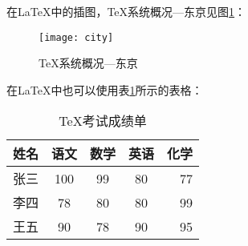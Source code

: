 \documentclass{ctexart}
\begin{document}
	
%	

%
	
	在\LaTeX{}中的插图，\TeX 系统概况---东京见图\ref{fig-city}：
	\begin{figure}[htbp]
		\centering %
		\texttt{[image: city]}
		\caption{\TeX 系统概况---东京} \label{fig-city} %
	\end{figure}
	
	在\LaTeX{}中也可以使用表\ref{tab-score}所示的表格：
	\begin{table}[htbp]
		\centering
		\caption{\TeX 考试成绩单} \label{tab-score}
		\begin{tabular}{|l|c|c|c|r|} 
			\hline
			姓名 & 语文 & 数学 & 英语 & 化学 \\
			\hline \hline
			张三 & 100 & 99 & 80 & 77 \\
			\hline
			李四 & 78 & 80 & 80 & 99 \\
			\hline
			王五 & 90 & 78 & 90 & 95 \\
			\hline
		\end{tabular}
	\end{table}
	
\end{document}
